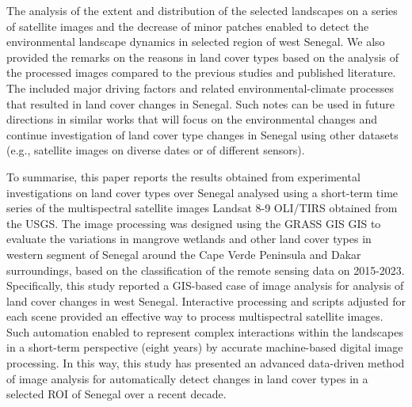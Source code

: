 \documentclass[land,article,submit,pdftex,moreauthors]{Definitions/mdpi}
\begin{document}
The analysis of the extent and distribution of the selected landscapes on a series of satellite images and the decrease of minor patches enabled to detect the environmental landscape dynamics in selected region of west Senegal. We also provided the remarks on the reasons in land cover types based on the analysis of the processed images compared to the previous studies and published literature. The included major driving factors and related environmental-climate processes that resulted in land cover changes in Senegal. Such notes can be used in future directions in similar works that will focus on the environmental changes and continue investigation of land cover type changes in Senegal using other datasets (e.g., satellite images on diverse dates or of different sensors).

To summarise, this paper reports the results obtained from experimental investigations on land cover types over Senegal analysed using a short-term time series of the multispectral satellite images Landsat 8-9 OLI/TIRS obtained from the USGS. The image processing was designed using the GRASS GIS GIS to evaluate the variations in mangrove wetlands and other land cover types in western segment of Senegal around the Cape Verde Peninsula and Dakar surroundings, based on the classification of the remote sensing data on 2015-2023. Specifically, this study reported a GIS-based case of image analysis for analysis of land cover changes in west Senegal. Interactive processing and  scripts adjusted for each scene provided an effective way to process multispectral satellite images. Such automation enabled to represent complex interactions within the landscapes in a short-term perspective (eight years) by accurate machine-based digital image processing. In this way, this study has presented an advanced data-driven method of image analysis for automatically detect changes in land cover types in a selected ROI of Senegal over a recent decade.





\end{document}
